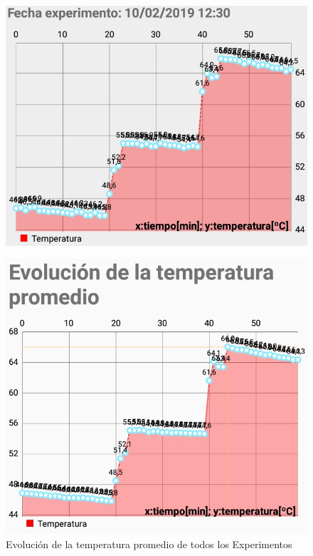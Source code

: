             \begin{figure}[H]    
                \centering
                \includegraphics[scale=0.65]{Pruebas/EscalonadaExp3.jpg}
                \label{fig:EscExp3}
            \end{figure}

            \begin{figure}[H]
                \centering
                \includegraphics[scale=0.65]{Pruebas/EscalonadaEvolTempProm.jpg}
                \caption{Evolución de la temperatura promedio de todos los Experimentos}
                \label{fig:EscTempProm}
            \end{figure}
        
